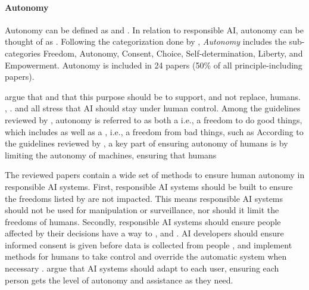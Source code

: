 \paragraph{Autonomy}
Autonomy can be defined as  and  \parencite{dictionary_autonomy}. In relation to responsible AI, autonomy can be thought of as  \parencite[p.~697-698]{Floridi_2018}. Following the categorization done by \textcite[Table 1]{Ryan_2021}, \textit{Autonomy} includes the sub-categories Freedom, Autonomy, Consent, Choice, Self-determination, Liberty, and Empowerment. Autonomy is included in 24 papers (50\% of all principle-including papers).

\textcite[p.~5]{Rothenberger_2019} argue that  and that this purpose should be to support, and not replace, humans. \textcite[p.~387]{Thelisson_2018}, \textcite[p.~102]{Lu_2022}. \textcite[p.~53]{Fjeld_2020} and \textcite[p.~416]{Clarke_2019} all stress that AI should stay under human control. Among the guidelines reviewed by \textcite[p.~11]{Jobin_2019}, autonomy is referred to as both a  i.e., a freedom to do good things, which includes  as well as a , i.e., a freedom from bad things, such as  According to the guidelines reviewed by \textcite[p.~698]{Floridi_2018}, a key part of ensuring autonomy of humans is by limiting the autonomy of machines, ensuring that humans  

The reviewed papers
contain a wide set of methods to ensure human autonomy in responsible AI systems. First, responsible AI systems should be built to ensure the freedoms listed by \textcite{Jobin_2019} are not impacted. This means responsible AI systems should not be used for manipulation or surveillance, nor should it limit the freedoms of humans. Secondly, responsible AI systems should ensure people affected by their decisions have a way to  \parencite[p.~102]{Lu_2022},  \parencite[p.~53]{Fjeld_2020} and  \parencite[p.~54]{Fjeld_2020}. AI developers should ensure informed consent is given before data is collected from people \parencite{Lukkien_2021,Jobin_2019}, and implement methods for humans to take control and override the automatic system when necessary \parencite{Floridi_2018,Rakova_2021}. \textcite{Liu_2021} argue that AI systems should adapt to each user, ensuring each person gets the level of autonomy and assistance as they need. 

